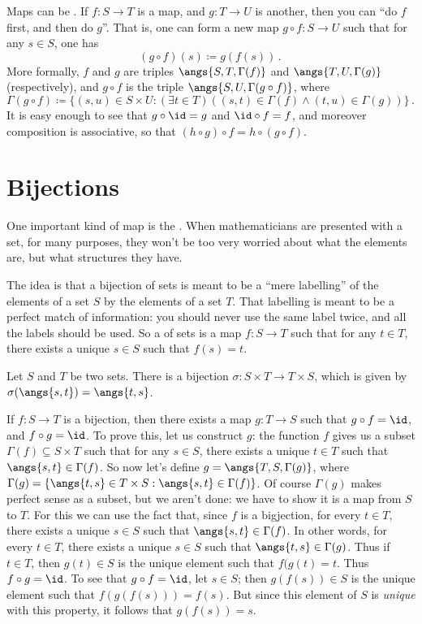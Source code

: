 Maps can be .
If $f\colon S \to T$ is a map, and $g\colon T \to U$ is another, then you can \enquote{do $f$ first, and then do $g$}.
That is, one can form a new map $g\circ f\colon S \to U$ such that for any $s\in S$, one has
\[
	(g\circ f)(s)\coloneq g(f(s)) \period
\]
More formally, $f$ and $g$ are triples $\angs{S,T,\Gamma(f)}$ and $\angs{T,U,\Gamma(g)}$ (respectively), and $g\circ f$ is the triple $\angs{S,U,\Gamma(g\circ f)}$, where
\[
	\Gamma(g\circ f)\coloneq\{(s,u)\in S\times U : (\exists t\in T)((s,t)\in\Gamma(f)\wedge(t,u)\in\Gamma(g))\}\period
\]
It is easy enough to see that $g\circ\id=g$ and $\id\circ f=f$, and moreover composition is associative, so that $(h\circ g)\circ f=h\circ(g\circ f)$.

\section{Bijections}%
\label{sec:bijections}

One important kind of map is the .
When mathematicians are presented with a set, for many purposes, they won't be too very worried about what the elements are, but what structures they have.

The idea is that a bijection of sets is meant to be a \enquote{mere labelling} of the elements of a set $S$ by the elements of a set $T$.
That labelling is meant to be a perfect match of information:
you should never use the same label twice, and
all the labels should be used.
So a  of sets is a map $f\colon S \to T$ such that for any $t\in T$, there exists a unique $s\in S$ such that $f(s)=t$.

\begin{exm}
	Let $S$ and $T$ be two sets.
	There is a bijection $ \sigma \colon S \times T \to T \times S $, which is given by $\sigma(\angs{s,t}) = \angs{t,s}$.
\end{exm}

If $ f \colon S \to T $ is a bijection, then there exists a map $ g \colon T \to S $ such that $g \circ f = \id $, and $f \circ g = \id$.
To prove this, let us construct $g$:
the function $f $ gives us a subset $\Gamma(f) \subseteq S \times T$ such that for any $s \in S$, there exists a unique $ t \in T$ such that $ \angs{s, t} \in \Gamma(f)$.
So now let's define $g = \angs{T, S, \Gamma(g)}$, where $\Gamma(g) = \{ \angs{t,s} \in T \times S : \angs{s, t} \in \Gamma(f) \}$.
Of course $\Gamma(g)$ makes perfect sense as a subset, but we aren't done:
we have to show it is a map from $S$ to $T$.
For this we can use the fact that, since $f$ is a bigjection, for every $t \in T$, there exists a unique $s \in S $ such that $\angs{s,t} \in \Gamma(f)$.
In other words, for every $t \in T$, there exists a unique $s \in S $ such that $\angs{t,s} \in \Gamma(g)$.
Thus if $t \in T$, then $g(t) \in S$ is the unique element such that $f(g(t) = t$.
Thus $f \circ g = \id$.
To see that $g \circ f = \id$, let $ s \in S$;
then $g(f(s)) \in S$ is the unique element such that $f(g(f(s))) = f(s)$. 
But since this element of $S$ is \emph{unique} with this property, it follows that $g(f(s)) = s $.

